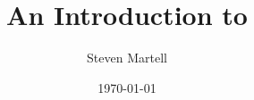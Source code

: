 \documentclass[sans]{beamer}
\title[\iscam]{An Introduction to \iscam}
\author{Steven Martell}
\institute[UBC Fisheries Centre]
{
University of British Columbia \\
\medskip
{\emph{s.martell@fisheries.ubc.ca}}
}
\date{\today}
\begin{document}
%
\begin{frame}
\titlepage
\end{frame}
%





% 
% 
% 
%  
%  
%  
\end{document}
